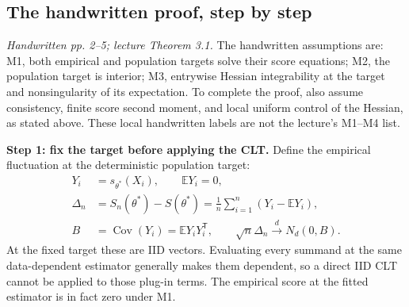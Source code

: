 \documentclass[12pt]{article}
\newcommand{\E}{\mathbb E}
\begin{document}
\subsection{The handwritten proof, step by step}
\textit{Handwritten pp. 2--5; lecture Theorem 3.1.}
The handwritten assumptions are: M1, both empirical and population targets
solve their score equations; M2, the population target is interior; M3,
entrywise Hessian integrability at the target and nonsingularity of its
expectation. To complete the proof, also assume consistency, finite score
second moment, and local uniform control of the Hessian, as stated above.
These local handwritten labels are not the lecture's M1--M4 list.

\textbf{Step 1: fix the target before applying the CLT.}
Define the empirical fluctuation at the deterministic population target:
\begin{align}
 Y_i&=s_{\theta^*}(X_i),\qquad \E Y_i=0,\\
 \Delta_n&=S_n(\theta^*)-S(\theta^*)
 =\frac1n\sum_{i=1}^n(Y_i-\E Y_i),\\
 B&=\operatorname{Cov}(Y_i)=\E Y_iY_i^{\mathsf T},\qquad
 \sqrt n\Delta_n\xrightarrow{d}N_d(0,B).
\end{align}
At the fixed target these are IID vectors. Evaluating every summand at the
same data-dependent estimator generally makes them dependent, so a direct
IID CLT cannot be applied to those plug-in terms. The empirical score at
the fitted estimator is in fact zero under M1.
\end{document}

